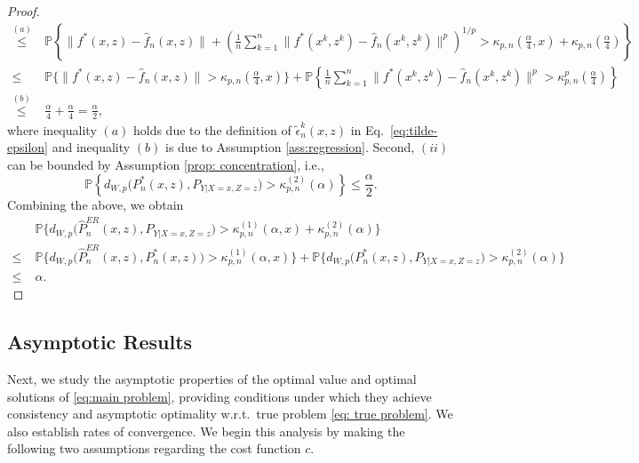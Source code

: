 \documentclass[onefignum,onetabnum]{siamart251216}
\begin{document}
\begin{proof}
\begin{align*}
        \overset{(a)}{\le} & \ \mathbb{P}\left\{\big\|f^*(x,z)-\hat{f}_n(x,z)\big\| +  \left(\frac{1}{n}\sum_{k=1}^n \big\|f^*(x^k,z^k) - \hat{f}_n(x^k,z^k)\big\|^p\right)^{1/p} > \kappa_{p,n} (\frac{\alpha}{4},x) + \kappa_{p,n} (\frac{\alpha}{4})\right\} 
    \\
         \leq &\  \mathbb{P}\Bigg\{\big\|f^*(x,z)-\hat{f}_n(x,z)\big\| > \kappa_{p,n}(\frac{\alpha}{4},x)\Bigg\} + \mathbb{P}\left\{\frac{1}{n} \sum_{k=1}^n \big\|f^*(x^k,z^k) - \hat{f}_n(x^k,z^k)\big\|^p > \kappa_{p,n}^p(\frac{\alpha}{4})\right\} 
    \\
         \overset{(b)}{\leq} &\ \frac{\alpha}{4} + \frac{\alpha}{4} = \frac{\alpha}{2},
    \end{align*}
\normalsize
where inequality $(a)$ holds due to the definition of $\tilde{\epsilon}_n^k(x,z)$ in Eq.\ \eqref{eq:tilde-epsilon} and inequality $(b)$ is due to Assumption \ref{ass:regression}.
Second, $(ii)$ can be bounded by Assumption \ref{prop: concentration}, i.e.,
\begin{equation*}
\mathbb P \left\{
d_{W,p}\bigl(P_n^*(x,z),P_{Y|X=x,Z=z}\bigr)
>
\kappa_{p,n}^{(2)}(\alpha)
\right\}
\le \frac{\alpha}{2}.
\end{equation*}
Combining the above, we obtain
\footnotesize
\begin{align*}
    & \mathbb P \biggl\{
d_{W,p}\bigl(\hat P_n^{ER}(x,z),P_{Y|X=x,Z=z}\bigr)
>
\kappa_{p,n}^{(1)}(\alpha,x)+\kappa_{p,n}^{(2)}(\alpha)
\biggr\} 
\\
\le\;&
\mathbb P\biggl\{
d_{W,p}\bigl(\hat P_n^{ER}(x,z),P_n^*(x,z)\bigr)
>
\kappa_{p,n}^{(1)}(\alpha,x)
\biggr\}
+
\mathbb P\biggl\{
d_{W,p}\bigl(P_n^*(x,z),P_{Y|X=x,Z=z}\bigr)
>
\kappa_{p,n}^{(2)}(\alpha)
\biggr\}
\\
\le\;& \alpha.
\end{align*}
\normalsize
\end{proof}

\subsection{Asymptotic Results}
Next, we study the asymptotic properties of the optimal value and optimal solutions of \eqref{eq:main problem}, providing conditions under which they achieve consistency and asymptotic optimality w.r.t.\ true problem \eqref{eq: true problem}. We also establish rates of convergence.  We begin this analysis by making the following two assumptions regarding the cost function $c$. 
\end{document}
